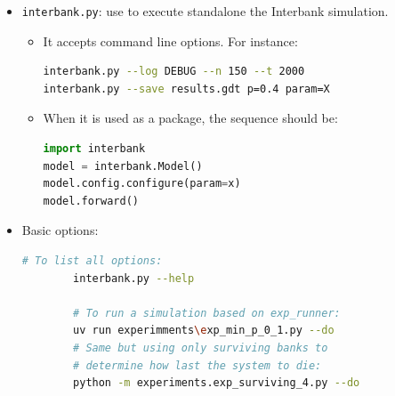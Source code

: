 \documentclass{article}
\begin{document}
\begin{itemize}
    \item \texttt{interbank.py}: use to execute standalone the Interbank simulation.
    \begin{itemize}
        \item It accepts command line options. For instance:
            \begin{lstlisting}[language=bash, basicstyle=\ttfamily\small]
interbank.py --log DEBUG --n 150 --t 2000
interbank.py --save results.gdt p=0.4 param=X
            \end{lstlisting}
        \item When it is used as a package, the sequence should be:
            \begin{lstlisting}[language=Python, basicstyle=\ttfamily\small]
import interbank
model = interbank.Model()
model.config.configure(param=x)
model.forward()
            \end{lstlisting}
    \end{itemize}
    \item Basic options:
        \begin{lstlisting}[language=bash, basicstyle=\ttfamily\small]
        # To list all options:
        interbank.py --help

        # To run a simulation based on exp_runner:
        uv run experimments\exp_min_p_0_1.py --do
        # Same but using only surviving banks to  
        # determine how last the system to die:
        python -m experiments.exp_surviving_4.py --do
        \end{lstlisting}


\end{itemize}
\end{document}
